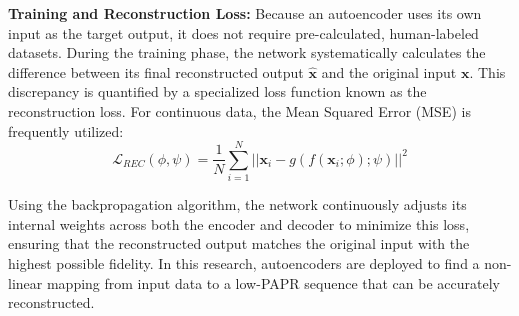 \textbf{Training and Reconstruction Loss:}
Because an autoencoder uses its own input as the target output, it does not require pre-calculated, human-labeled datasets. During the training phase, the network systematically calculates the difference between its final reconstructed output $\hat{\mathbf{x}}$ and the original input $\mathbf{x}$. This discrepancy is quantified by a specialized loss function known as the reconstruction loss. For continuous data, the Mean Squared Error (MSE) is frequently utilized:
\begin{equation*}
    \mathcal{L}_{REC}(\phi, \psi) = \frac{1}{N} \sum_{i=1}^{N} ||\mathbf{x}_i - g(f(\mathbf{x}_i; \phi); \psi)||^2
\end{equation*}

Using the backpropagation algorithm, the network continuously adjusts its internal weights across both the encoder and decoder to minimize this loss, ensuring that the reconstructed output matches the original input with the highest possible fidelity. In this research, autoencoders are deployed to find a non-linear mapping from input data to a low-PAPR sequence that can be accurately reconstructed.
